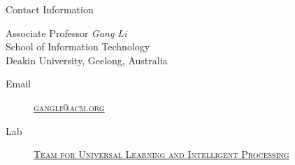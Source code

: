 \documentclass[
 size=14pt,
 paper=smartboard,  %
 mode=present, 		%
 display=slides, 	%
 style=tuliplab,  	%
 pauseslide,
 fleqn,leqno]{powerdot}
\begin{document}
\begin{wideslide}[toc=,bm=]{Contact Information}
\centering
{}
\twocolumn[
lcolwidth=0.35\linewidth,
rcolwidth=0.65\linewidth
]
{
}
{
Associate Professor \emph{Gang Li}\\
School of Information Technology\\
Deakin University, Geelong, Australia
\begin{description}
 \item[Email] \href{mailto:gangli@acm.org}
 {\textsc{\footnotesize{gangli@acm.org}}}

 \item[Lab] \href{http://www.tulip.org.au}
 {\textsc{\footnotesize{Team for Universal Learning and Intelligent Processing}}}
\end{description}
}
\end{wideslide}
\end{document}
